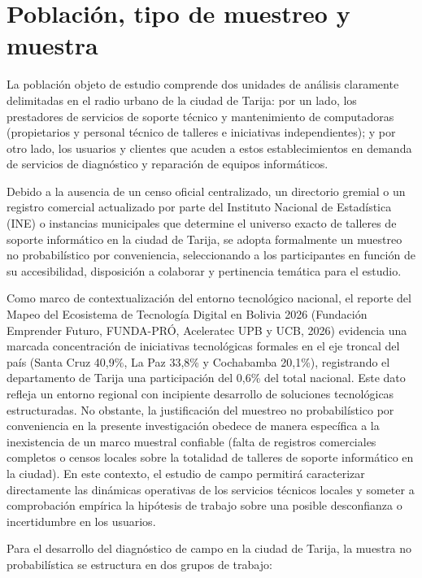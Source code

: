 \section{Población, tipo de muestreo y muestra}

La población objeto de estudio comprende dos unidades de análisis claramente delimitadas en el radio urbano de la ciudad de Tarija: por un lado, los prestadores de servicios de soporte técnico y mantenimiento de computadoras (propietarios y personal técnico de talleres e iniciativas independientes); y por otro lado, los usuarios y clientes que acuden a estos establecimientos en demanda de servicios de diagnóstico y reparación de equipos informáticos.

Debido a la ausencia de un censo oficial centralizado, un directorio gremial o un registro comercial actualizado por parte del Instituto Nacional de Estadística (INE) o instancias municipales que determine el universo exacto de talleres de soporte informático en la ciudad de Tarija, se adopta formalmente un muestreo no probabilístico por conveniencia, seleccionando a los participantes en función de su accesibilidad, disposición a colaborar y pertinencia temática para el estudio.

Como marco de contextualización del entorno tecnológico nacional, el reporte del Mapeo del Ecosistema de Tecnología Digital en Bolivia 2026 (Fundación Emprender Futuro, FUNDA-PRÓ, Aceleratec UPB y UCB, 2026) evidencia una marcada concentración de iniciativas tecnológicas formales en el eje troncal del país (Santa Cruz 40,9\%, La Paz 33,8\% y Cochabamba 20,1\%), registrando el departamento de Tarija una participación del 0,6\% del total nacional. Este dato refleja un entorno regional con incipiente desarrollo de soluciones tecnológicas estructuradas. No obstante, la justificación del muestreo no probabilístico por conveniencia en la presente investigación obedece de manera específica a la inexistencia de un marco muestral confiable (falta de registros comerciales completos o censos locales sobre la totalidad de talleres de soporte informático en la ciudad). En este contexto, el estudio de campo permitirá caracterizar directamente las dinámicas operativas de los servicios técnicos locales y someter a comprobación empírica la hipótesis de trabajo sobre una posible desconfianza o incertidumbre en los usuarios.

Para el desarrollo del diagnóstico de campo en la ciudad de Tarija, la muestra no probabilística se estructura en dos grupos de trabajo:

